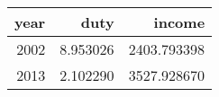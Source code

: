 \begin{tabular}{rrr}
\toprule
 year &      duty &       income \\
\midrule
 2002 &  8.953026 &  2403.793398 \\
 2013 &  2.102290 &  3527.928670 \\
\bottomrule
\end{tabular}
